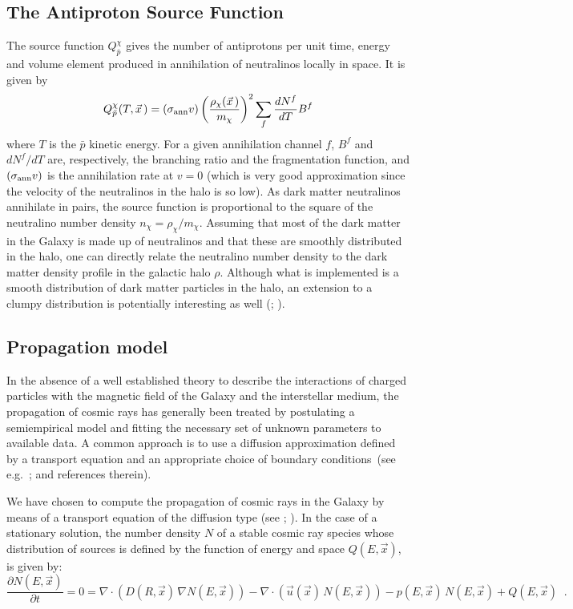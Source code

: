 \subsection{The Antiproton Source Function}

The source function $Q_{\bar{p}}^{\chi}$ gives the number of antiprotons
per unit time, energy and volume element produced in annihilation
of neutralinos locally in space. It is given by
\begin{equation}
   Q_{\bar{p}}^{\chi}(T,\vec{x}\,)=
   (\sigma_{\rm ann}v)
   \left(\frac{\rho_{\chi}(\vec{x}\,)}{m_{\chi}}\right)^{2}
   \sum_{f}^{}\frac{dN^{f}}{dT}B^{f}
   \label{sourcefkn}
\end{equation}
where $T$ is the $\bar{p}$ kinetic energy. For a given annihilation
channel $f$, $B^{f}$ and $dN^{f} / dT$ are, respectively, the branching ratio
and the fragmentation function, and $(\sigma_{\rm ann}v)$ is the
annihilation rate at $v=0$ (which is very good approximation since the
velocity of the neutralinos in the halo is so low).
As dark matter neutralinos annihilate in pairs, the source function is
proportional to the square of the neutralino number density
$n_{\chi} = \rho_{\chi} / m_{\chi}$.
Assuming that most of the dark matter in the Galaxy is made up of neutralinos
and that these are smoothly distributed in the halo, one can directly relate
the neutralino number density to the dark matter density profile in the
galactic halo $\rho$.
%
Although what is implemented is a smooth distribution of dark
matter particles in the halo, an extension to a clumpy distribution is
potentially interesting as well (\cite{clumpy}; \cite{pieroclumpy}).

\subsection{Propagation model}
\label{sec:prop}

In the absence of a well established theory to describe the
interactions of charged particles with the magnetic field of the
Galaxy and the interstellar medium, the propagation of cosmic rays has
generally been treated by postulating a semiempirical model and
fitting the necessary set of unknown parameters to available data.  A
common approach is to use a diffusion approximation defined by a
transport equation and an appropriate choice of boundary
conditions~(see e.g.\ \cite{Berezinskii}; \cite{Gaisserbook} and
references therein).

We have chosen to compute the propagation of cosmic rays in the Galaxy by
means of a
  transport equation of the diffusion type
  (see \cite{Berezinskii}; \cite{Gaisserbook}).
In the case of a stationary solution, the number density $N$ of a
stable cosmic ray
species whose distribution of sources is defined by the function of
energy and space $Q(E,\vec{x})$, is given by:
\begin{equation}
\frac{\partial{N(E,\vec{x})}}{\partial{t}} = 0 = \nabla \cdot
\left(D(R,\vec{x})\,\nabla N(E,\vec{x})\right)
- \nabla \cdot \left( \vec{u}(\vec{x})\,N(E,\vec{x}) \right)
- p(E,\vec{x})\,N(E,\vec{x}) + Q(E,\vec{x}) \;\;.
\label{eq:diff}
\end{equation}


